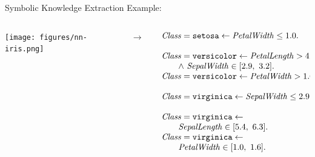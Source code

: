 \documentclass[presentation]{beamer}\mode<presentation>{\usetheme{AMSBolognaFC}}
\begin{document}
\begin{frame}[allowframebreaks]{Symbolic Knowledge Extraction}
    Example:
    \begin{columns}
        \begin{column}{.43\linewidth}
            \texttt{[image: figures/nn-iris.png]}
        \end{column}
        $\rightarrow$
        \begin{column}{.53\linewidth}\small
            \[ 
                \begin{array}{l}
                    \variable{Class} = \functor{setosa} \leftarrow \variable{PetalWidth} \leq 1.0 \fullstop
                    \\
                    \\
                    \variable{Class} = \functor{versicolor} \leftarrow \variable{PetalLength} > 4.9 \\ 
                        \qquad  \wedge\ \variable{SepalWidth} \in [2.9,\ 3.2] \fullstop
                    \\
                    \variable{Class} = \functor{versicolor} \leftarrow  \variable{PetalWidth} > 1.6 \fullstop
                    \\
                    \\
                    \variable{Class} = \functor{virginica} \leftarrow \variable{SepalWidth} \leq 2.9 \fullstop
                    \\
                    \\
                    \variable{Class} = \functor{virginica} \leftarrow \\ 
                        \qquad \variable{SepalLength} \in [5.4,\ 6.3] \fullstop
                    \\
                    \variable{Class} = \functor{virginica} \leftarrow \\ 
                        \qquad \variable{PetalWidth} \in [1.0,\ 1.6] \fullstop
                \end{array}    
            \]
        \end{column}
    \end{columns}
\end{frame}
\end{document}
